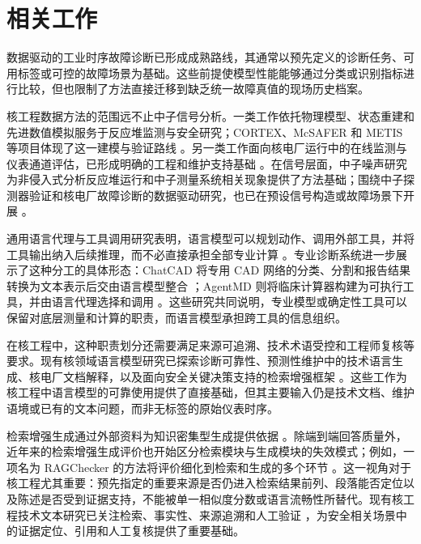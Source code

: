 \section{相关工作}

数据驱动的工业时序故障诊断已形成成熟路线，其通常以预先定义的诊断任务、可用标签或可控的故障场景为基础。这些前提使模型性能能够通过分类或识别指标进行比较，但也限制了方法直接迁移到缺乏统一故障真值的现场历史档案。

核工程数据方法的范围远不止中子信号分析。一类工作依托物理模型、状态重建和先进数值模拟服务于反应堆监测与安全研究；CORTEX、McSAFER 和 METIS 等项目体现了这一建模与验证路线 \citep{demaziere2022cortex}。另一类工作面向核电厂运行中的在线监测与仪表通道评估，已形成明确的工程和维护支持基础 \citep{iaea2008olm1,iaea2008olm2,hashemian2011online}。在信号层面，中子噪声研究为非侵入式分析反应堆运行和中子测量系统相关现象提供了方法基础；围绕中子探测器验证和核电厂故障诊断的数据驱动研究，也已在预设信号构造或故障场景下开展 \citep{pazsit2010noise,tambouratzis2020neutron,tambouratzis2020decomposition,elbordany2024fault}。

通用语言代理与工具调用研究表明，语言模型可以规划动作、调用外部工具，并将工具输出纳入后续推理，而不必直接承担全部专业计算 \citep{yao2023react,schick2023toolformer,patil2024gorilla}。专业诊断系统进一步展示了这种分工的具体形态：ChatCAD 将专用 CAD 网络的分类、分割和报告结果转换为文本表示后交由语言模型整合 \citep{wang2024chatcad}；AgentMD 则将临床计算器构建为可执行工具，并由语言代理选择和调用 \citep{jin2025agentmd}。这些研究共同说明，专业模型或确定性工具可以保留对底层测量和计算的职责，而语言模型承担跨工具的信息组织。

在核工程中，这种职责划分还需要满足来源可追溯、技术术语受控和工程师复核等要求。现有核领域语言模型研究已探索诊断可靠性、预测性维护中的技术语言生成、核电厂文档解释，以及面向安全关键决策支持的检索增强框架 \citep{reeves2024reliability,lin2025cws,mapes2025uprate,ndum2026radiant}。这些工作为核工程中语言模型的可靠使用提供了直接基础，但其主要输入仍是技术文档、维护语境或已有的文本问题，而非无标签的原始仪表时序。

检索增强生成通过外部资料为知识密集型生成提供依据 \citep{lewis2020rag}。除端到端回答质量外，近年来的检索增强生成评价也开始区分检索模块与生成模块的失效模式；例如，一项名为 RAGChecker 的方法将评价细化到检索和生成的多个环节 \citep{ru2024ragchecker}。这一视角对于核工程尤其重要：预先指定的重要来源是否仍进入检索结果前列、段落能否定位以及陈述是否受到证据支持，不能被单一相似度分数或语言流畅性所替代。现有核工程技术文本研究已关注检索、事实性、来源追溯和人工验证 \citep{reeves2024reliability,lin2025cws,mapes2025uprate,ndum2026radiant}，为安全相关场景中的证据定位、引用和人工复核提供了重要基础。

